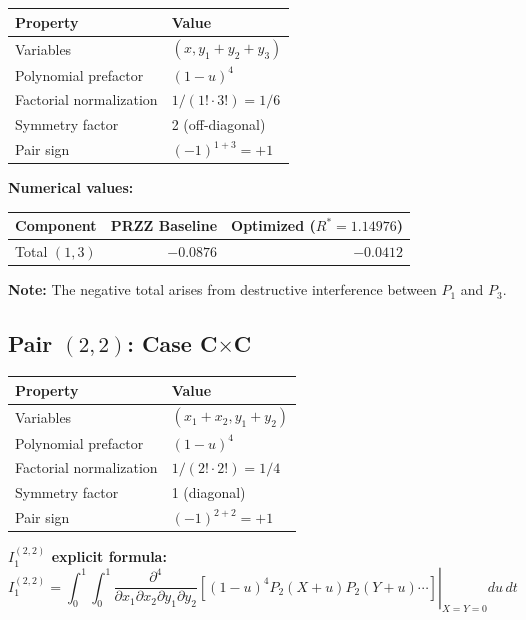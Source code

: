 \documentclass[11pt]{article}
\begin{document}
\begin{center}
\begin{tabular}{ll}
\toprule
Property & Value \\
\midrule
Variables & $(x, y_1+y_2+y_3)$ \\
Polynomial prefactor & $(1-u)^4$ \\
Factorial normalization & $1/(1! \cdot 3!) = 1/6$ \\
Symmetry factor & 2 (off-diagonal) \\
Pair sign & $(-1)^{1+3} = +1$ \\
\bottomrule
\end{tabular}
\end{center}

\textbf{Numerical values:}

\begin{center}
\begin{tabular}{lrr}
\toprule
Component & PRZZ Baseline & Optimized ($R^*=1.14976$) \\
\midrule
Total $(1,3)$ & $-0.0876$ & $-0.0412$ \\
\bottomrule
\end{tabular}
\end{center}

\textbf{Note:} The negative total arises from destructive interference between $P_1$ and $P_3$.

\subsection{Pair $(2,2)$: Case C$\times$C}

\begin{center}
\begin{tabular}{ll}
\toprule
Property & Value \\
\midrule
Variables & $(x_1+x_2, y_1+y_2)$ \\
Polynomial prefactor & $(1-u)^4$ \\
Factorial normalization & $1/(2! \cdot 2!) = 1/4$ \\
Symmetry factor & 1 (diagonal) \\
Pair sign & $(-1)^{2+2} = +1$ \\
\bottomrule
\end{tabular}
\end{center}

\textbf{$I_1^{(2,2)}$ explicit formula:}
\begin{equation}
I_1^{(2,2)} = \int_0^1 \int_0^1 \left.\frac{\partial^4}{\partial x_1 \partial x_2 \partial y_1 \partial y_2}\left[(1-u)^4 P_2(X+u) P_2(Y+u) \cdots\right]\right|_{X=Y=0} du\, dt
\end{equation}
\end{document}
